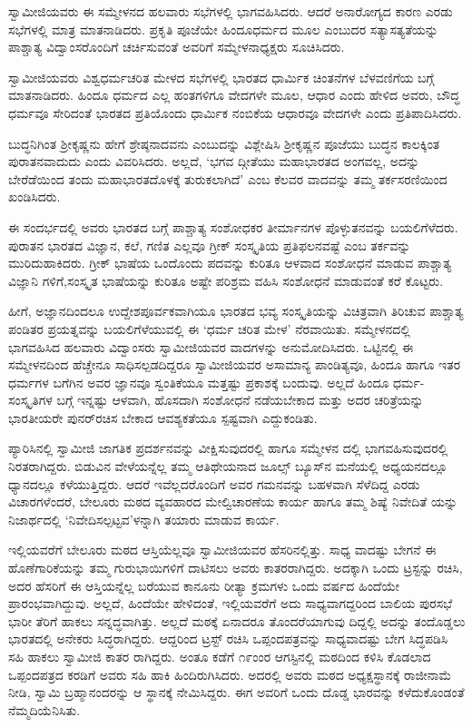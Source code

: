 ಸ್ವಾಮೀಜಿಯವರು ಈ ಸಮ್ಮೇಳನದ ಹಲವಾರು ಸಭೆಗಳಲ್ಲಿ ಭಾಗವಹಿಸಿದರು. ಆದರೆ ಅನಾರೋಗ್ಯದ ಕಾರಣ ಎರಡು ಸಭೆಗಳಲ್ಲಿ ಮಾತ್ರ ಮಾತನಾಡಿದರು. ಪ್ರಕೃತಿ ಪೂಜೆಯೇ ಹಿಂದೂಧರ್ಮದ ಮೂಲ ಎಂಬುದರ ಸತ್ಯಾಸತ್ಯತೆಯನ್ನು ಪಾಶ್ಚಾತ್ಯ ವಿದ್ವಾಂಸರೊಂದಿಗೆ ಚರ್ಚಿಸುವಂತೆ ಅವರಿಗೆ ಸಮ್ಮೇಳನಾಧ್ಯಕ್ಷರು ಸೂಚಿಸಿದರು.

ಸ್ವಾಮೀಜಿಯವರು ವಿಶ್ವಧರ್ಮಚರಿತ ಮೇಳದ ಸಭೆಗಳಲ್ಲಿ ಭಾರತದ ಧಾರ್ಮಿಕ ಚಿಂತನೆಗಳ ಬೆಳವಣಿಗೆಯ ಬಗ್ಗೆ ಮಾತನಾಡಿದರು. ಹಿಂದೂ ಧರ್ಮದ ಎಲ್ಲ ಹಂತಗಳಿಗೂ ವೇದಗಳೇ ಮೂಲ, ಆಧಾರ ಎಂದು ಹೇಳಿದ ಅವರು, ಬೌದ್ಧ ಧರ್ಮವೂ ಸೇರಿದಂತೆ ಭಾರತದ ಪ್ರತಿಯೊಂದು ಧಾರ್ಮಿಕ ನಂಬಿಕೆಯ ಆಧಾರವೂ ವೇದಗಳೇ ಎಂದು ಪ್ರತಿಪಾದಿಸಿದರು.

ಬುದ್ಧನಿಗಿಂತ ಶ್ರೀಕೃಷ್ಣನು ಹೇಗೆ ಶ್ರೇಷ್ಠನಾದವನು ಎಂಬುದನ್ನು ವಿಶ್ಲೇಷಿಸಿ ಶ್ರೀಕೃಷ್ಣನ ಪೂಜೆಯು ಬುದ್ಧನ ಕಾಲಕ್ಕಿಂತ ಪುರಾತನವಾದುದು ಎಂದು ವಿವರಿಸಿದರು. ಅಲ್ಲದೆ, ‘ಭಗವ ದ್ಗೀತೆಯು ಮಹಾಭಾರತದ ಅಂಗವಲ್ಲ, ಅದನ್ನು ಬೇರೆಡೆಯಿಂದ ತಂದು ಮಹಾಭಾರತದೊಳಕ್ಕೆ ತುರುಕಲಾಗಿದೆ’ ಎಂಬ ಕೆಲವರ ವಾದವನ್ನು ತಮ್ಮ ತರ್ಕಸರಣಿಯಿಂದ ಖಂಡಿಸಿದರು.

ಈ ಸಂದರ್ಭದಲ್ಲಿ ಅವರು ಭಾರತದ ಬಗ್ಗೆ ಪಾಶ್ಚಾತ್ಯ ಸಂಶೋಧಕರ ತೀರ್ಮಾನಗಳ ಪೊಳ್ಳುತನವನ್ನು ಬಯಲಿಗೆಳೆದರು. ಪುರಾತನ ಭಾರತದ ವಿಜ್ಞಾನ, ಕಲೆ, ಗಣಿತ ಎಲ್ಲವೂ ಗ್ರೀಕ್ ಸಂಸ್ಕೃತಿಯ ಪ್ರತಿಫಲನವಷ್ಟೆ ಎಂಬ ತರ್ಕವನ್ನು ಮುರಿದುಹಾಕಿದರು. ಗ್ರೀಕ್ ಭಾಷೆಯ ಒಂದೊಂದು ಪದವನ್ನು ಕುರಿತೂ ಆಳವಾದ ಸಂಶೋಧನೆ ಮಾಡುವ ಪಾಶ್ಚಾತ್ಯ ವಿಜ್ಞಾನಿ ಗಳಿಗೆ,ಸಂಸ್ಕೃತ ಭಾಷೆಯನ್ನು ಕುರಿತೂ ಅಷ್ಟೇ ಪರಿಶ್ರಮ ವಹಿಸಿ ಸಂಶೋಧನೆ ಮಾಡುವಂತೆ ಕರೆ ಕೊಟ್ಟರು.

ಹೀಗೆ, ಅಜ್ಞಾನದಿಂದಲೂ ಉದ್ದೇಶಪೂರ್ವಕವಾಗಿಯೂ ಭಾರತದ ಭವ್ಯ ಸಂಸ್ಕೃತಿಯನ್ನು ವಿಚಿತ್ರವಾಗಿ ತಿರಿಚುವ ಪಾಶ್ಚಾತ್ಯ ಪಂಡಿತರ ಪ್ರಯತ್ನವನ್ನು ಬಯಲಿಗೆಳೆಯುವಲ್ಲಿ ಈ ‘ಧರ್ಮ ಚರಿತ ಮೇಳ’ ನೆರವಾಯಿತು. ಸಮ್ಮೇಳನದಲ್ಲಿ ಭಾಗವಹಿಸಿದ ಹಲವಾರು ವಿದ್ವಾಂಸರು ಸ್ವಾಮೀಜಿಯವರ ವಾದಗಳನ್ನು ಅನುಮೋದಿಸಿದರು. ಒಟ್ಟಿನಲ್ಲಿ ಈ ಸಮ್ಮೇಳನದಿಂದ ಹೆಚ್ಚೇನೂ ಸಾಧಿಸಲ್ಪಡದಿದ್ದರೂ ಸ್ವಾಮೀಜಿಯವರ ಅಸಾಮಾನ್ಯ ಪಾಂಡಿತ್ಯವೂ, ಹಿಂದೂ ಹಾಗೂ ಇತರ ಧರ್ಮಗಳ ಬಗೆಗಿನ ಅವರ ಜ್ಞಾನವೂ ಸ್ವಂತಿಕೆಯೂ ಮತ್ತಷ್ಟು ಪ್ರಕಾಶಕ್ಕೆ ಬಂದುವು. ಅಲ್ಲದೆ ಹಿಂದೂ ಧರ್ಮ-ಸಂಸ್ಕೃತಿಗಳ ಬಗ್ಗೆ ಇನ್ನಷ್ಟು ಆಳವಾಗಿ, ಹೊಸದಾಗಿ ಸಂಶೋಧನೆ ನಡೆಯಬೇಕಾದ ಮತ್ತು ಅದರ ಚರಿತ್ರೆಯನ್ನು ಭಾರತೀಯರೇ ಪುನರ್​ರಚಿಸ ಬೇಕಾದ ಆವಶ್ಯಕತೆಯೂ ಸ್ಪಷ್ಟವಾಗಿ ಎದ್ದುಕಂಡಿತು.

ಪ್ಯಾರಿಸಿನಲ್ಲಿ ಸ್ವಾಮೀಜಿ ಜಾಗತಿಕ ಪ್ರದರ್ಶನವನ್ನು ವೀಕ್ಷಿಸುವುದರಲ್ಲಿ ಹಾಗೂ ಸಮ್ಮೇಳನ ದಲ್ಲಿ ಭಾಗವಹಿಸುವುದರಲ್ಲಿ ನಿರತರಾಗಿದ್ದರು. ಬಿಡುವಿನ ವೇಳೆಯನ್ನೆಲ್ಲ ತಮ್ಮ ಆತಿಥೇಯನಾದ ಜೂಲ್ಸ್ ಬ್ಯೂಸ್​ನ ಮನೆಯಲ್ಲಿ ಅಧ್ಯಯನದಲ್ಲೂ ಧ್ಯಾನದಲ್ಲೂ ಕಳೆಯುತ್ತಿದ್ದರು. ಆದರೆ ಇವೆಲ್ಲದರೊಂದಿಗೆ ಅವರ ಗಮನವನ್ನು ಬಹಳವಾಗಿ ಸೆಳೆದಿದ್ದ ಎರಡು ವಿಚಾರಗಳೆಂದರೆ, ಬೇಲೂರು ಮಠದ ವ್ಯವಹಾರದ ಮೇಲ್ವಿಚಾರಣೆಯ ಕಾರ್ಯ ಹಾಗೂ ತಮ್ಮ ಶಿಷ್ಯೆ ನಿವೇದಿತೆ ಯನ್ನು ನಿಜಾರ್ಥದಲ್ಲಿ ‘ನಿವೇದಿಸಲ್ಪಟ್ಟವ’ಳನ್ನಾಗಿ ತಯಾರು ಮಾಡುವ ಕಾರ್ಯ.

ಇಲ್ಲಿಯವರೆಗೆ ಬೇಲೂರು ಮಠದ ಆಸ್ತಿಯೆಲ್ಲವೂ ಸ್ವಾಮೀಜಿಯವರ ಹೆಸರಿನಲ್ಲಿತ್ತು. ಸಾಧ್ಯ ವಾದಷ್ಟು ಬೇಗನೆ ಈ ಹೊಣೆಗಾರಿಕೆಯನ್ನು ತಮ್ಮ ಗುರುಭಾಯಿಗಳಿಗೆ ದಾಟಿಸಲು ಅವರು ಕಾತರರಾಗಿದ್ದರು. ಅದಕ್ಕಾಗಿ ಒಂದು ಟ್ರಸ್ಟನ್ನು ರಚಿಸಿ, ಅದರ ಹೆಸರಿಗೆ ಈ ಆಸ್ತಿಯನ್ನೆಲ್ಲ ಬರೆಯುವ ಕಾನೂನು ರೀತ್ಯಾ ಕ್ರಮಗಳು ಒಂದು ವರ್ಷದ ಹಿಂದೆಯೇ ಪ್ರಾರಂಭವಾಗಿದ್ದುವು. ಅಲ್ಲದೆ, ಹಿಂದೆಯೇ ಹೇಳಿದಂತೆ, ಇಲ್ಲಿಯವರೆಗೆ ಅದು ಸಾಧ್ಯವಾಗದ್ದರಿಂದ ಬಾಲಿಯ ಪುರಸಭೆ ಭಾರೀ ತೆರಿಗೆ ಹಾಕಲು ಸನ್ನದ್ಧವಾಗಿತ್ತು. ಅಲ್ಲದೆ ಮಠಕ್ಕೆ ಏನಾದರೂ ತೊಂದರೆಯಾಗುವು ದಿದ್ದಲ್ಲಿ ಅದನ್ನು ತಂದೊಡ್ಡಲು ಭಾರತದಲ್ಲಿ ಅನೇಕರು ಸಿದ್ಧರಾಗಿದ್ದರು. ಆದ್ದರಿಂದ ಟ್ರಸ್ಟ್ ರಚಿಸಿ ಒಪ್ಪಂದಪತ್ರವನ್ನು ಸಾಧ್ಯವಾದಷ್ಟು ಬೇಗ ಸಿದ್ಧಪಡಿಸಿ ಸಹಿ ಹಾಕಲು ಸ್ವಾಮೀಜಿ ಕಾತರ ರಾಗಿದ್ದರು. ಅಂತೂ ಕಡೆಗೆ ೧೯ಂಂರ ಆಗಸ್ಟಿನಲ್ಲಿ ಮಠದಿಂದ ಕಳಿಸಿ ಕೊಡಲಾದ ಒಪ್ಪಂದಪತ್ರದ ಕರಡಿಗೆ ಅವರು ಸಹಿ ಹಾಕಿ ಹಿಂದಿರುಗಿಸಿದರು. ಅದರಲ್ಲಿ ಅವರು ಮಠದ ಅಧ್ಯಕ್ಷಸ್ಥಾನಕ್ಕೆ ರಾಜೀನಾಮೆ ನೀಡಿ, ಸ್ವಾಮಿ ಬ್ರಹ್ಮಾನಂದರನ್ನು ಆ ಸ್ಥಾನಕ್ಕೆ ನೇಮಿಸಿದ್ದರು. ಈಗ ಅವರಿಗೆ ಒಂದು ದೊಡ್ಡ ಭಾರವನ್ನು ಕಳೆದುಕೊಂಡಂತೆ ನೆಮ್ಮದಿಯೆನಿಸಿತು.

